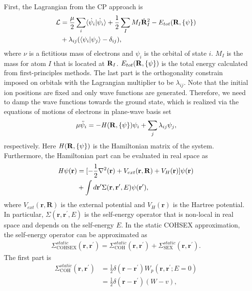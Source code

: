 \documentclass[prb,twocolumn,showpacs,preprintnumbers,superscriptaddress,amsmath,amssymb]{revtex4}
\begin{document}
First, the Lagrangian from the CP approach is
\begin{align}
\mathcal{L}&=\frac{\mu}{2}\sum_{i}\langle\dot{\psi}_{i}|\dot{\psi}_{i}\rangle
+\frac{1}{2}\sum_{I}M_{I}\dot{\mathrm{\bf R}}_{I}^2-E_{tot}(\mathrm{\bf R},\{\psi\})\\
&+\lambda_{ij}(\langle\psi_{i}|\psi_{j}\rangle-\delta_{ij}), \nonumber
\end{align}
where $\nu$ is a fictitious mass of electrons and $\psi_{i}$ is the orbital of state $i$.
$M_{I}$ is the mass for atom $I$ that is located at $\mathrm{\bf R}_{I}$.
$E_{tot}(\mathrm{\bf R},\{\psi\})$ is the total energy calculated from first-principles methods.
The last part is the orthogonality constrain imposed on orbitals with the Lagrangian multiplier to be $\lambda_{ij}$.
Note that the initial ion positions are fixed and only wave functions are generated.
Therefore, we need to damp the wave functions towards the ground state, which is realized via
the equations of motions of electrons in plane-wave basis set
\begin{align}
\mu\ddot{\psi}_{i}=-{\it H}(\mathrm{\bf R},\{\psi\})\psi_i+\sum_{j}\lambda_{ij}\psi_j,
\end{align}
respectively. Here ${\it H(\mathrm{\bf R},\{\psi\})}$ is the Hamiltonian matrix of the system.
Furthermore, the Hamiltonian part can be evaluated in real space as
\begin{align}
{\it H}\psi(\mathbf{r})&=[-\frac{1}{2}\nabla^2(\mathbf{r})+V_{ext}(\mathbf{r, R})+V_H(\mathbf{r})]\psi(\mathbf{r})\\
&+\int d\mathbf{r}^{\prime}\Sigma(\mathbf{r},\mathbf{r^{\prime}},E)\psi(\mathbf{r^{\prime}}),
\end{align}
where $V_{ext}(\mathbf{r, R})$ is the external potential and $V_H(\mathbf{r})$ is the Hartree potential. In particular,
$\Sigma(\mathbf{r},\mathbf{r^{\prime}},E)$ is the self-energy operator that is non-local in real space and depends on the self-energy $E$.
In the static COHSEX approximation, the self-energy operator can be approximated as
\begin{align}
\Sigma_{\mathrm{COHSEX}}^{static}(\mathbf{r,r^{\prime}})=\Sigma_{\mathrm{COH}}^{static}(\mathbf{r,r^{\prime}})+
\Sigma_{\mathrm{SEX}}^{static}(\mathbf{r,r^{\prime}}).
\end{align}
The first part is
\begin{align}
\Sigma_{\mathrm{COH}}^{static}(\mathbf{r},\mathbf{r^{\prime}})&=\frac{1}{2}\delta(\mathbf{r-r^{\prime}})W_p(\mathbf{r, r^{\prime}}; E=0)\\
&=\frac{1}{2}\delta(\mathbf{r-r^{\prime}})(W-v),
\end{align}
\end{document}
